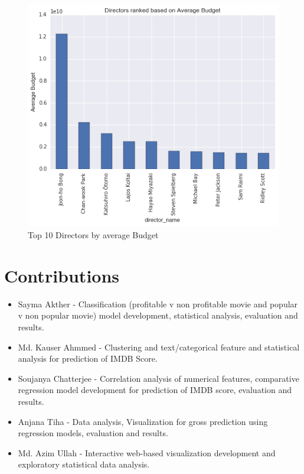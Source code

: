 \documentclass{article}%
\begin{document}
\begin{figure}
\centering
\includegraphics[width=1.0\columnwidth]{Fig/DirectorsRankedonAverageBudget.png}
\caption{Top 10 Directors by average Budget}
\label{fig:DirectorsRankedonAverageBudget}
\end{figure}

\section{Contributions}

\begin{itemize}
\item Sayma Akther - Classification (profitable v non profitable movie and popular v non popular movie) model development, statistical analysis, evaluation and results.
\item Md. Kauser Ahmmed - Clustering and text/categorical feature and statistical analysis for prediction of IMDB Score.
\item Soujanya Chatterjee - Correlation analysis of numerical features, comparative regression model development for prediction of IMDB score, evaluation and results.
\item Anjana Tiha - Data analysis, Visualization for gross prediction using regression models, evaluation and results.
\item Md. Azim Ullah - Interactive web-based visualization development and exploratory statistical data analysis.
\end{itemize}
\end{document}
